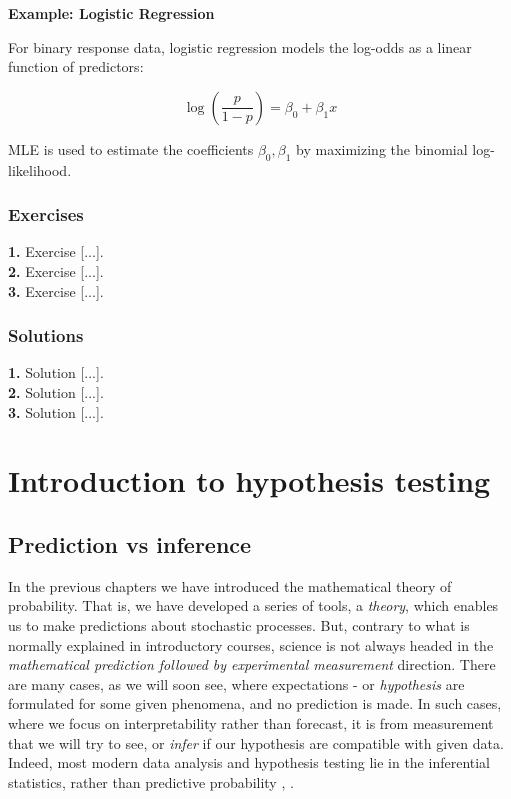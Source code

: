 \documentclass{book}
\begin{document}
\textbf{Example: Logistic Regression}

For binary response data, logistic regression models the log-odds as a linear function of predictors:

\[
\log\left( \frac{p}{1 - p} \right) = \beta_0 + \beta_1 x
\]

MLE is used to estimate the coefficients $\beta_0, \beta_1$ by maximizing the binomial log-likelihood.

\newpage

\subsection*{Exercises}

\textbf{1.} Exercise [...].\\

\textbf{2.} Exercise [...].\\

\textbf{3.} Exercise [...].\\

\newpage

\subsection*{Solutions}

\textbf{1.} Solution [...].\\

\textbf{2.} Solution [...].\\

\textbf{3.} Solution [...].\\



\chapter{Introduction to hypothesis testing}

\section{Prediction vs inference}

In the previous chapters we have introduced the mathematical theory of probability. That is, we have developed a series of tools, a \textit{theory}, which enables us to make predictions about stochastic processes. But, contrary to what is normally explained in introductory courses, science is not always headed in the \textit{mathematical prediction followed by experimental measurement} direction. There are many cases, as we will soon see, where expectations - or \textit{hypothesis} are formulated for some given phenomena, and no prediction is made. In such cases, where we focus on interpretability rather than forecast, it is from measurement that we will try to see, or \textit{infer} if our hypothesis are compatible with given data. Indeed, most modern data analysis and hypothesis testing lie in the inferential statistics, rather than predictive probability \cite{fisher1925},  \cite{fisher1935}.\\
\end{document}
